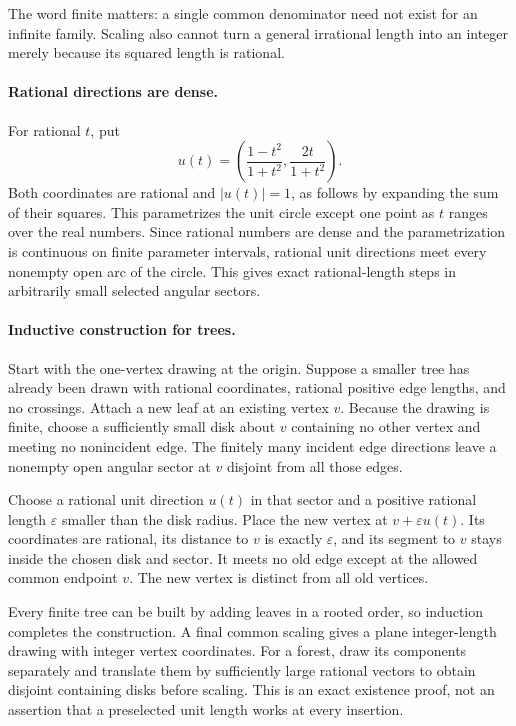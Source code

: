 \documentclass[11pt,a4paper]{article}
\begin{document}
The word finite matters: a single common denominator need not exist for an infinite family. Scaling also cannot turn a general irrational length into an integer merely because its squared length is rational.

\paragraph{Rational directions are dense.}
For rational $t$, put
\[
u(t)=\left(\frac{1-t^2}{1+t^2},\frac{2t}{1+t^2}\right).
\]
Both coordinates are rational and $|u(t)|=1$, as follows by expanding the sum of their squares. This parametrizes the unit circle except one point as $t$ ranges over the real numbers. Since rational numbers are dense and the parametrization is continuous on finite parameter intervals, rational unit directions meet every nonempty open arc of the circle. This gives exact rational-length steps in arbitrarily small selected angular sectors.

\paragraph{Inductive construction for trees.}
Start with the one-vertex drawing at the origin. Suppose a smaller tree has already been drawn with rational coordinates, rational positive edge lengths, and no crossings. Attach a new leaf at an existing vertex $v$. Because the drawing is finite, choose a sufficiently small disk about $v$ containing no other vertex and meeting no nonincident edge. The finitely many incident edge directions leave a nonempty open angular sector at $v$ disjoint from all those edges.

Choose a rational unit direction $u(t)$ in that sector and a positive rational length $\varepsilon$ smaller than the disk radius. Place the new vertex at $v+\varepsilon u(t)$. Its coordinates are rational, its distance to $v$ is exactly $\varepsilon$, and its segment to $v$ stays inside the chosen disk and sector. It meets no old edge except at the allowed common endpoint $v$. The new vertex is distinct from all old vertices.

Every finite tree can be built by adding leaves in a rooted order, so induction completes the construction. A final common scaling gives a plane integer-length drawing with integer vertex coordinates. For a forest, draw its components separately and translate them by sufficiently large rational vectors to obtain disjoint containing disks before scaling. This is an exact existence proof, not an assertion that a preselected unit length works at every insertion.
\end{document}
